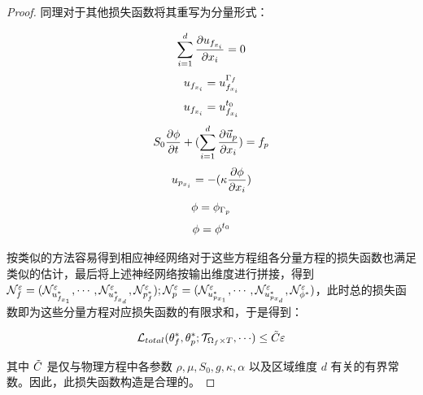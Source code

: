 \begin{proof}
同理对于其他损失函数将其重写为分量形式：

\begin{equation}
    \sum_{i=1}^{d} \toD{\Ufi}{x_i} = 0
\end{equation}
\begin{equation}
    \Ufi = {u^{\Bf}_{f_{x_i}}}
\end{equation}
\begin{equation}
    \Ufi = {u^{t_0}_{f_{x_i}}}
\end{equation}
\begin{equation}
    S_{0}\toD{\pp}{t} + (\sum_{i=1}^{d} \toD{\Up}{x_i}) = \fp
\end{equation}
\begin{equation}
    \Upi = -(\kappa \* \toD{\pp}{x_i})
\end{equation}
\begin{equation}
    \pp = \pp_{\Bp}
\end{equation}
\begin{equation}
    \pp = \pp^{t_0}
\end{equation}

按类似的方法容易得到相应神经网络对于这些方程组各分量方程的损失函数也满足类似的估计，最后将上述神经网络按输出维度进行拼接，得到 $\epsNN{f} = (\tNNtUfi[1], \cdots, \tNNtUfi[d], \tNNtpf); \epsNN{p} = (\tNNtUpi[1], \cdots, \tNNtUpi[d], \tNNtpp)$，此时总的损失函数即为这些分量方程对应损失函数的有限求和，于是得到：

\begin{equation}
    \Loss{total}{\params^*_f,\params^*_p}{\TDf,\cdots} \le \Tilde{C} \varepsilon
\end{equation}

其中 $\Tilde{C}$ 是仅与物理方程中各参数 $\rho, \mu, S_0, g, \kappa, \alpha$ 以及区域维度 $d$ 有关的有界常数。因此，此损失函数构造是合理的。
\end{proof}
